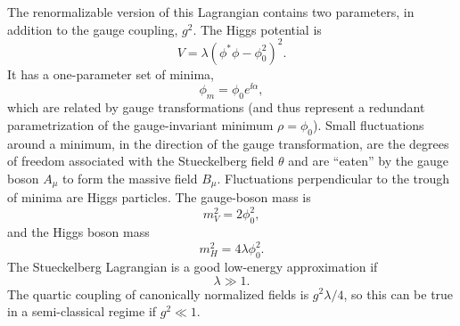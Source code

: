 The renormalizable version of this Lagrangian contains two parameters, in
addition to the gauge coupling, $g^2$. The Higgs potential is
\begin{equation*}
  V=\lambda(\phi^*\phi-\phi_0^2)^2.
\end{equation*}
It has a one-parameter set of minima,
\begin{equation*}
  \phi_m=\phi_0e^{\ii\alpha},
\end{equation*}
which are related by gauge transformations (and thus represent a redundant
parametrization of the gauge-invariant minimum $\rho=\phi_0$). Small
fluctuations around a minimum, in the direction of the gauge transformation,
are the degrees of freedom associated with the Stueckelberg field $\theta$ and
are ``eaten'' by the gauge boson $A_\mu$ to form the massive field $B_\mu$.
Fluctuations perpendicular to the trough of minima are Higgs particles. The
gauge-boson mass is
\begin{equation*}
  m_V^2=2\phi_0^2,
\end{equation*}
and the Higgs boson mass
\begin{equation*}
  m_H^2=4\lambda\phi_0^2.
\end{equation*}
The Stueckelberg Lagrangian is a good low-energy approximation if
\begin{equation*}
  \lambda\gg1.
\end{equation*}
The quartic coupling of canonically normalized fields is $g^2\lambda/4$, so
this can be true in a semi-classical regime if $g^2\ll1$.

